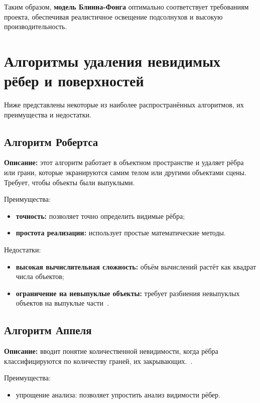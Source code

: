 Таким образом, \textbf{модель Блинна-Фонга} оптимально соответствует требованиям проекта, обеспечивая реалистичное освещение подсолнухов и высокую производительность.



\section{Алгоритмы удаления невидимых рёбер и поверхностей}

Ниже представлены некоторые из наиболее распространённых алгоритмов, их преимущества и недостатки.

\subsection{Алгоритм Робертса}

\textbf{Описание:} этот алгоритм работает в объектном пространстве и удаляет рёбра или грани, которые экранируются самим телом или другими объектами сцены. Требует, чтобы объекты были выпуклыми.

Преимущества:
\begin{itemize}
\item \textbf{точность:} позволяет точно определить видимые рёбра;
\item \textbf{простота реализации:} использует простые математические методы.
\end{itemize}

Недостатки:
\begin{itemize}
\item \textbf{высокая вычислительная сложность:} объём вычислений растёт как квадрат числа объектов;
\item \textbf{ограничение на невыпуклые объекты:} требует разбиения невыпуклых объектов на выпуклые части~\cite{lit1, lit2, lit5}.
\end{itemize}

\subsection{Алгоритм Аппеля}

\textbf{Описание:} вводит понятие количественной невидимости, когда рёбра классифицируются по количеству граней, их закрывающих.~\cite{lit3}.

Преимущества:
\begin{itemize}
\item упрощение анализа: позволяет упростить анализ видимости рёбер.
\end{itemize}


